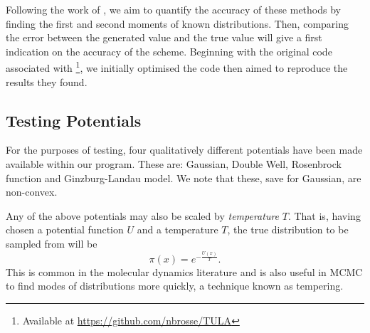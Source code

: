 Following the work of \cite{Brosse18tULA}, we aim to quantify the accuracy of these methods by finding the first and second moments of known distributions. Then, comparing the error between the generated value and the true value will give a first indication on the accuracy of the scheme. Beginning with the original code associated with \cite{Brosse18tULA}\footnote{Available at \url{https://github.com/nbrosse/TULA}}, we initially optimised the code then aimed to reproduce the results they found. 

\subsection{Testing Potentials}
For the purposes of testing, four qualitatively different potentials have been made available within our program. These are: Gaussian, Double Well, Rosenbrock function and Ginzburg-Landau model. We note that these, save for Gaussian, are non-convex.

Any of the above potentials may also be scaled by \textit{temperature} $T$. That is, having chosen a potential function $U$ and a temperature $T$, the true distribution to be sampled from will be
\[\pi(x) = e^{-\frac{U(x)}{T}}.\]
This is common in the molecular dynamics literature and is also useful in MCMC to find modes of distributions more quickly, a technique known as tempering.

